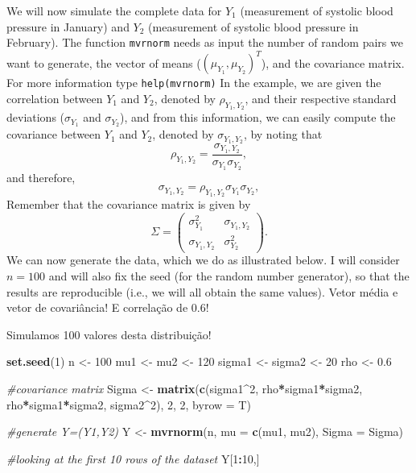 \documentclass[
]{article}
\newenvironment{Shaded}{\begin{snugshade}}{\end{snugshade}}
\newcommand{\AttributeTok}[1]{\textcolor[rgb]{0.13,0.29,0.53}{#1}}
\newcommand{\CommentTok}[1]{\textcolor[rgb]{0.56,0.35,0.01}{\textit{#1}}}
\newcommand{\DecValTok}[1]{\textcolor[rgb]{0.00,0.00,0.81}{#1}}
\newcommand{\FloatTok}[1]{\textcolor[rgb]{0.00,0.00,0.81}{#1}}
\newcommand{\FunctionTok}[1]{\textcolor[rgb]{0.13,0.29,0.53}{\textbf{#1}}}
\newcommand{\NormalTok}[1]{#1}
\newcommand{\OtherTok}[1]{\textcolor[rgb]{0.56,0.35,0.01}{#1}}
\newcommand{\SpecialCharTok}[1]{\textcolor[rgb]{0.81,0.36,0.00}{\textbf{#1}}}
\begin{document}
We will now simulate the complete data for \(Y_1\) (measurement of
systolic blood pressure in January) and \(Y_2\) (measurement of systolic
blood pressure in February). The function \texttt{mvrnorm} needs as
input the number of random pairs we want to generate, the vector of
means (\((\mu_{Y_1},\mu_{Y_2})^{T}\)), and the covariance matrix. For
more information type \texttt{help(mvrnorm)} In the example, we are
given the correlation between \(Y_1\) and \(Y_2\), denoted by
\(\rho_{Y_{1},Y_{2}}\), and their respective standard deviations
(\(\sigma_{Y_{1}}\) and \(\sigma_{Y_{2}}\)), and from this information,
we can easily compute the covariance between \(Y_1\) and \(Y_2\),
denoted by \(\sigma_{Y_{1},Y_{2}}\), by noting that \[
\rho_{Y_{1},Y_{2}}=\frac{\sigma_{Y_{1},Y_{2}}}{\sigma_{Y_{1}}\sigma_{Y_{2}}},
\] and therefore, \[
\sigma_{Y_{1},Y_{2}} = \rho_{Y_{1},Y_{2}}\sigma_{Y_{1}}\sigma_{Y_{2}},
\] Remember that the covariance matrix is given by \[
\Sigma=
\begin{pmatrix}
\sigma_{Y_{1}}^2 & \sigma_{Y_{1},Y_{2}}\\
\sigma_{Y_{1},Y_{2}} & \sigma_{Y_{2}}^2
\end{pmatrix}.
\] We can now generate the data, which we do as illustrated below. I
will consider \(n=100\) and will also fix the seed (for the random
number generator), so that the results are reproducible (i.e., we will
all obtain the same values). Vetor média e vetor de covariância! E
correlação de 0.6!

Simulamos 100 valores desta distribuição!

\begin{Shaded}
\begin{Highlighting}[]
\FunctionTok{set.seed}\NormalTok{(}\DecValTok{1}\NormalTok{)}
\NormalTok{n }\OtherTok{\textless{}{-}} \DecValTok{100} 
\NormalTok{mu1 }\OtherTok{\textless{}{-}}\NormalTok{ mu2 }\OtherTok{\textless{}{-}} \DecValTok{120}
\NormalTok{sigma1 }\OtherTok{\textless{}{-}}\NormalTok{ sigma2 }\OtherTok{\textless{}{-}} \DecValTok{20}
\NormalTok{rho }\OtherTok{\textless{}{-}} \FloatTok{0.6}

\CommentTok{\#covariance matrix}
\NormalTok{Sigma }\OtherTok{\textless{}{-}} \FunctionTok{matrix}\NormalTok{(}\FunctionTok{c}\NormalTok{(sigma1}\SpecialCharTok{\^{}}\DecValTok{2}\NormalTok{, rho}\SpecialCharTok{*}\NormalTok{sigma1}\SpecialCharTok{*}\NormalTok{sigma2, rho}\SpecialCharTok{*}\NormalTok{sigma1}\SpecialCharTok{*}\NormalTok{sigma2, sigma2}\SpecialCharTok{\^{}}\DecValTok{2}\NormalTok{), }\DecValTok{2}\NormalTok{, }\DecValTok{2}\NormalTok{, }\AttributeTok{byrow =}\NormalTok{ T)}

\CommentTok{\#generate Y=(Y1,Y2)}
\NormalTok{Y }\OtherTok{\textless{}{-}} \FunctionTok{mvrnorm}\NormalTok{(n, }\AttributeTok{mu =} \FunctionTok{c}\NormalTok{(mu1, mu2), }\AttributeTok{Sigma =}\NormalTok{ Sigma)}

\CommentTok{\#looking at the first 10 rows of the dataset}
\NormalTok{Y[}\DecValTok{1}\SpecialCharTok{:}\DecValTok{10}\NormalTok{,]}
\end{Highlighting}
\end{Shaded}
\end{document}
